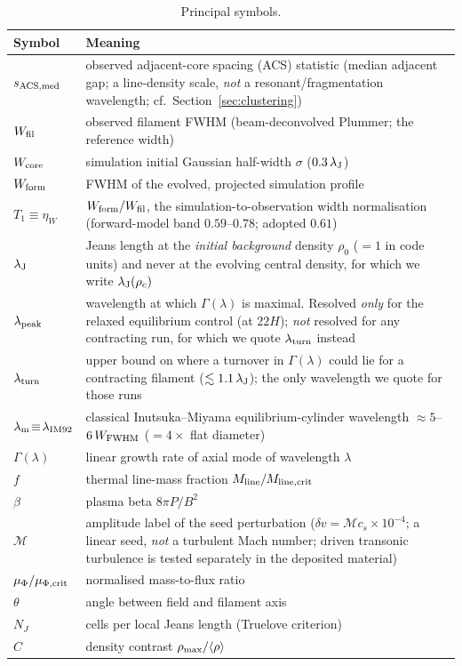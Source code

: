 \documentclass[usenatbib,twoside,twocolumn]{mnras}
\begin{document}
\begin{table}
\caption{Principal symbols.}
\label{tab:symbols}
\footnotesize
\setlength{\tabcolsep}{4pt}
\begin{tabular}{lp{6.1cm}}
\toprule
Symbol & Meaning \\
\midrule
$s_{\rm ACS,med}$ & observed adjacent-core spacing (ACS) statistic (median adjacent gap; a line-density scale, \emph{not} a resonant/fragmentation wavelength; cf.\ Section~\ref{sec:clustering}) \\
$W_{\rm fil}$ & observed filament FWHM (beam-deconvolved Plummer; the reference width) \\
$W_{\rm core}$ & simulation initial Gaussian half-width $\sigma$ ($0.3\,\lambda_{\rm J}$) \\
$W_{\rm form}$ & FWHM of the evolved, projected simulation profile \\
$T_1\!\equiv\!\eta_W$ & $W_{\rm form}/W_{\rm fil}$, the simulation-to-observation width normalisation (forward-model band $0.59$--$0.78$; adopted $0.61$) \\
$\lambda_{\rm J}$ & Jeans length at the \emph{initial background} density $\rho_0$ ($=1$ in code units) and never at the evolving central density, for which we write $\lambda_{\rm J}(\rho_c)$ \\
$\lambda_{\rm peak}$ & wavelength at which $\Gamma(\lambda)$ is maximal. Resolved \emph{only} for the relaxed equilibrium control (at $22H$); \emph{not} resolved for any contracting run, for which we quote $\lambda_{\rm turn}$ instead \\
$\lambda_{\rm turn}$ & upper bound on where a turnover in $\Gamma(\lambda)$ could lie for a contracting filament ($\lesssim1.1\,\lambda_{\rm J}$); the only wavelength we quote for those runs \\
$\lambda_{\rm m}\!\equiv\!\lambda_{\rm IM92}$ & classical Inutsuka--Miyama equilibrium-cylinder wavelength $\approx5$--$6\,W_{\rm FWHM}$ ($=4\times$ flat diameter) \\
$\Gamma(\lambda)$ & linear growth rate of axial mode of wavelength $\lambda$ \\
$f$ & thermal line-mass fraction $M_{\rm line}/M_{\rm line,crit}$ \\
$\beta$ & plasma beta $8\pi P/B^2$ \\
$\mathcal{M}$ & amplitude label of the seed perturbation ($\delta v=\mathcal{M}c_s\times10^{-4}$; a linear seed, \emph{not} a turbulent Mach number; driven transonic turbulence is tested separately in the deposited material) \\
$\mu_\Phi/\mu_{\Phi,\rm crit}$ & normalised mass-to-flux ratio \\
$\theta$ & angle between field and filament axis \\
$N_J$ & cells per local Jeans length (Truelove criterion) \\
$C$ & density contrast $\rho_{\rm max}/\langle\rho\rangle$ \\
\bottomrule
\end{tabular}
\end{table}
\end{document}
